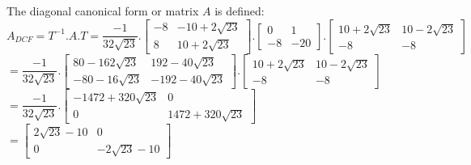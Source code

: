 \documentclass[14pt,a4paper]{article}
\begin{document}
\begin{enumerate}
		The diagonal canonical form or matrix $A$ is defined: \\
			$A_{DCF} = T^{-1}.A.T = \dfrac{-1}{32\sqrt{23}}.\begin{bmatrix} -8 & -10 + 2\sqrt{23} \\ 8 & 10+2\sqrt{23} \end{bmatrix} .\begin{bmatrix} 0&1 \\ -8&-20 \end{bmatrix} .\begin{bmatrix} 10+2\sqrt{23} & 10 - 2\sqrt{23} \\ -8 & -8 \end{bmatrix} $\\
			$ = \dfrac{-1}{32\sqrt{23}} .\begin{bmatrix} 80-162\sqrt{23} & 192 - 40\sqrt{23} \\ -80-16\sqrt{23} & -192-40\sqrt{23} \end{bmatrix} .\begin{bmatrix} 10+2\sqrt{23} & 10 - 2\sqrt{23} \\ -8 & -8 \end{bmatrix} $\\
			$ = \dfrac{-1}{32\sqrt{23}} .\begin{bmatrix} -1472+320\sqrt{23} & 0 \\ 0 & 1472+320\sqrt{23} \end{bmatrix} $\\
			$ = \begin{bmatrix} 2\sqrt{23} -10 & 0 \\ 0 & -2\sqrt{23} -10 \end{bmatrix} $ \\
	

\end{enumerate}
\end{document}
